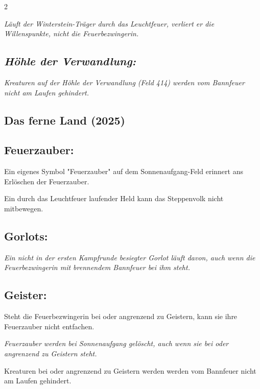 \documentclass[10pt, a4paper, oneside]{book}
\newcommand{\fan}[1]{\textit{#1}}
\begin{document}
\begin{multicols*}{2}
\begin{bgcolor}
\fan{Läuft der Winterstein-Träger durch das Leuchtfeuer, verliert er die Willenspunkte, nicht die Feuerbezwingerin.}


\subsection{\fan{Höhle der Verwandlung:}}

\fan{Kreaturen auf der Höhle der Verwandlung (Feld 414) werden vom Bannfeuer nicht am Laufen gehindert.}


\end{bgcolor}



\columnbreak


\begin{bgcolor}
\section{Das ferne Land (2025)}

\subsection{Feuerzauber:}

Ein eigenes Symbol "Feuerzauber" auf dem Sonnenaufgang-Feld erinnert ans Erlöschen der Feuerzauber.

Ein durch das Leuchtfeuer laufender Held kann das Steppenvolk nicht mitbewegen.
\supercite{DfL:Begleitheft}



\subsection{Gorlots:}

\fan{Ein nicht in der ersten Kampfrunde besiegter Gorlot läuft davon, auch wenn die Feuerbezwingerin mit brennendem Bannfeuer bei ihm steht.}



\subsection{Geister:}

Steht die Feuerbezwingerin bei oder angrenzend zu Geistern, kann sie ihre Feuerzauber nicht entfachen.

\fan{Feuerzauber werden bei Sonnenaufgang gelöscht, auch wenn sie bei oder angrenzend zu Geistern steht.}

Kreaturen bei oder angrenzend zu Geistern werden werden vom Bannfeuer nicht am Laufen gehindert.


\end{bgcolor}
\end{multicols*}
\end{document}
